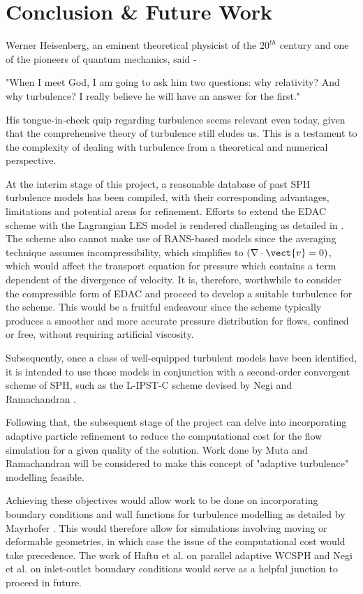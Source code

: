 
\chapter{Conclusion \& Future Work} %
\label{chap:conclusions-and-future-work}

Werner Heisenberg, an eminent theoretical physicist of the $20^{th}$ century and one of the pioneers of quantum mechanics, said -
\begin{displayquote}
    "When I meet God, I am going to ask him two questions: why relativity? And why turbulence? I really believe he will have an answer for the first."
\end{displayquote}
His tongue-in-cheek quip regarding turbulence seems relevant even today, given that the comprehensive theory of turbulence still eludes us. This is a testament to the complexity of dealing with turbulence from a theoretical and numerical perspective. 

At the interim stage of this project, a reasonable database of past SPH turbulence models has been compiled, with their corresponding advantages, limitations and potential areas for refinement.
Efforts to extend the EDAC scheme \parencite{Ramachandran2019} with the Lagrangian LES model is rendered challenging as detailed in . The scheme also cannot make use of RANS-based models since the averaging technique assumes incompressibility, which simplifies to $(\nabla \cdot \vect{v} = 0)$, which would affect the transport equation for pressure  which contains a term dependent of the divergence of velocity. It is, therefore, worthwhile to consider the compressible form of EDAC \parencite{Chola2021} and proceed to develop a suitable turbulence for the scheme. This would be a fruitful endeavour since the scheme typically produces a smoother and more accurate pressure distribution for flows, confined or free, without requiring artificial viscosity.

Subsequently, once a class of well-equipped turbulent models have been identified, it is intended to use those models in conjunction with a second-order convergent scheme of SPH, such as the L-IPST-C scheme devised by Negi and Ramachandran \parencite{Negi2022Techniques}. 

Following that, the subsequent stage of the project can delve into incorporating adaptive particle refinement to reduce the computational cost for the flow simulation for a given quality of the solution. Work done by Muta and Ramachandran \parencite{Muta2022} will be considered to make this concept of "adaptive turbulence" modelling feasible.

Achieving these objectives would allow work to be done on incorporating boundary conditions and wall functions for turbulence modelling as detailed by Mayrhofer \parencite{Mayrhofer2014}. 
This would therefore allow for simulations involving moving or deformable geometries, in which case the issue of the computational cost would take precedence. The work of Haftu et al. \parencite{Haftu2022} on parallel adaptive WCSPH and Negi et al. \parencite{negi2020improved} on inlet-outlet boundary conditions would serve as a helpful junction to proceed in future.
